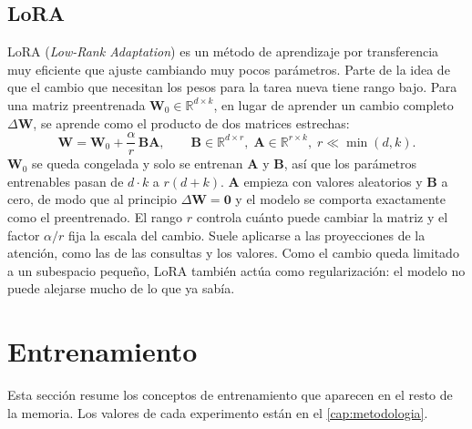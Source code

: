 \subsection{LoRA}
\label{sec:lora-teoria}

LoRA (\textit{Low-Rank Adaptation}) es un método de aprendizaje por transferencia muy eficiente que ajuste cambiando muy pocos parámetros\cite{hu2022lora}. Parte de la idea de que el cambio que necesitan los pesos para la tarea nueva tiene rango bajo. Para una matriz preentrenada $\mathbf{W}_0 \in \mathbb{R}^{d \times k}$, en lugar de aprender un cambio completo $\Delta\mathbf{W}$, se aprende como el producto de dos matrices estrechas:
\begin{equation}
  \mathbf{W} = \mathbf{W}_0 + \frac{\alpha}{r}\,\mathbf{B}\mathbf{A}, \qquad \mathbf{B} \in \mathbb{R}^{d \times r},\; \mathbf{A} \in \mathbb{R}^{r \times k},\; r \ll \min(d,k).
  \label{eq:lora}
\end{equation}
$\mathbf{W}_0$ se queda congelada y solo se entrenan $\mathbf{A}$ y $\mathbf{B}$, así que los parámetros entrenables pasan de $d \cdot k$ a $r(d+k)$. $\mathbf{A}$ empieza con valores aleatorios y $\mathbf{B}$ a cero, de modo que al principio $\Delta\mathbf{W} = \mathbf{0}$ y el modelo se comporta exactamente como el preentrenado. El rango $r$ controla cuánto puede cambiar la matriz y el factor $\alpha/r$ fija la escala del cambio. Suele aplicarse a las proyecciones de la atención, como las de las consultas y los valores. Como el cambio queda limitado a un subespacio pequeño, LoRA también actúa como regularización: el modelo no puede alejarse mucho de lo que ya sabía.

\section{Entrenamiento}
\label{sec:entrenamiento-teoria}

Esta sección resume los conceptos de entrenamiento que aparecen en el resto de la memoria. Los valores de cada experimento están en el \cref{cap:metodologia}.

